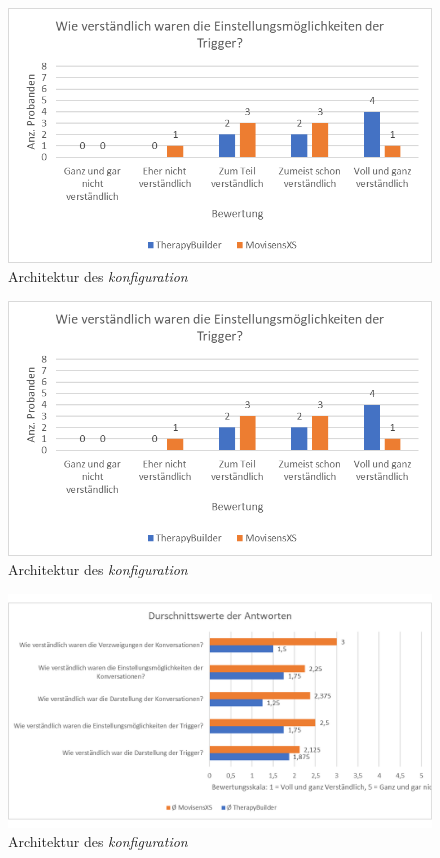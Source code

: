 \begin{figure}[h]
\centering
\includegraphics[width=1\textwidth]{pictures/diagramme/triggereinstellung}
\caption{Architektur des \emph{konfiguration}}
\label{triggereinstellung}
\end{figure}

\begin{figure}[h]
\centering
\includegraphics[width=1\textwidth]{pictures/diagramme/triggereinstellung}
\caption{Architektur des \emph{konfiguration}}
\label{triggereinstellung}
\end{figure}

\begin{figure}[h]
\centering
\includegraphics[width=1\textwidth]{pictures/diagramme/antwortendurchsch1}
\caption{Architektur des \emph{konfiguration}}
\label{antwortendurchsch1}
\end{figure}

